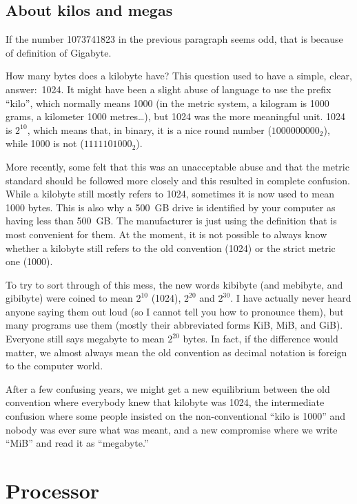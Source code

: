 \subsection{About kilos and megas}

If the number 1073741823 in the previous paragraph seems odd, that is because
of definition of Gigabyte.

How many bytes does a kilobyte have? This question used to have a simple,
clear, answer:~1024. It might have been a slight abuse of language to use the
prefix ``kilo'', which normally means 1000 (in the metric system, a kilogram is
1000 grams, a kilometer 1000 metres\ldots), but 1024 was the more meaningful
unit. 1024 is $2^{10}$, which means that, in binary, it is a nice round number
($1000000000_2$), while 1000 is not ($1111101000_2$).

More recently, some felt that this was an unacceptable abuse and that the
metric standard should be followed more closely and this resulted in complete
confusion. While a kilobyte still mostly refers to 1024, sometimes it is now
used to mean 1000 bytes. This is also why a 500~GB drive is identified by your
computer as having less than 500~GB. The manufacturer is just using the
definition that is most convenient for them. At the moment, it is not possible
to always know whether a kilobyte still refers to the old convention (1024) or
the strict metric one (1000).

To try to sort through of this mess, the new words kibibyte (and mebibyte, and
gibibyte) were coined to mean $2^{10}$ (1024), $2^{20}$ and $2^{30}$. I have
actually never heard anyone saying them out loud (so I cannot tell you how to
pronounce them), but many programs use them (mostly their abbreviated forms
KiB, MiB, and GiB). Everyone still says megabyte to mean $2^{20}$ bytes. In
fact, if the difference would matter, we almost always mean the old convention
as decimal notation is foreign to the computer world.

After a few confusing years, we might get a new equilibrium between the old
convention where everybody knew that kilobyte was 1024, the intermediate
confusion where some people insisted on the non-conventional ``kilo is 1000''
and nobody was ever sure what was meant, and a new compromise where we
write ``MiB'' and read it as ``megabyte.''

\section{Processor}

